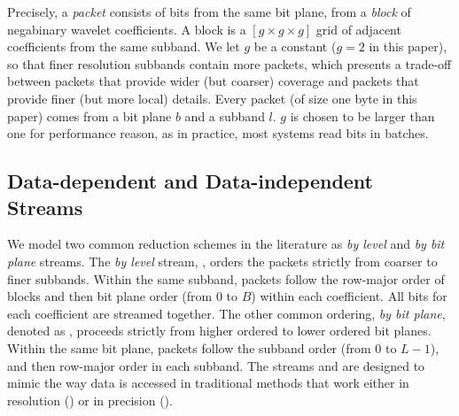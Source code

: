 Precisely, a \emph{packet} consists of bits from the same bit plane, from a \emph{block} of
negabinary wavelet coefficients. A block is a $[g\times g\times g]$ grid of adjacent coefficients
from the same subband. We let $g$ be a constant ($g=2$ in this paper), so that finer resolution
subbands contain more packets, which presents a trade-off between packets that provide wider (but
coarser) coverage and packets that provide finer (but more local) details. Every packet (of size one
byte in this paper) comes from a bit plane $b$ and a subband $l$. $g$ is chosen to be larger than
one for performance reason, as in practice, most systems read bits in batches.

\subsection{Data-dependent and Data-independent Streams} \label{sec:static-dynamic-streams}

We model two common reduction schemes in the literature as \emph{by level} and \emph{by bit plane}
streams. The \emph{by level} stream, \slvl, orders the packets strictly from coarser to finer
subbands. Within the same subband, packets follow the row-major order of blocks and then bit plane
order (from 0 to $B$) within each coefficient. All bits for each coefficient are streamed together.
The other common ordering, \emph{by bit plane}, denoted as \sbit, proceeds strictly from higher
ordered to lower ordered bit planes. Within the same bit plane, packets follow the subband order
(from $0$ to $L-1$), and then row-major order in each subband. The streams \slvl and \sbit are
designed to mimic the way data is accessed in traditional methods that work either in resolution
(\slvl) or in precision (\sbit).

